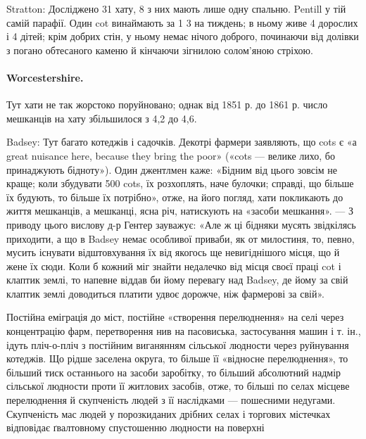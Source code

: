 Stratton: Досліджено 31 хату, 8 з них мають лише одну
спальню. Pentill у тій самій парафії. Один cot винаймають за
1 3 на тиждень; в ньому живе 4 дорослих і 4 дітей;
крім добрих стін, у ньому немає нічого доброго, починаючи від
долівки з погано обтесаного каменю й кінчаючи зігнилою солом’яною
стріхою.

\paragraph{Worcestershire.}

Тут хати не так жорстоко поруйновано; однак від 1851 р. до
1861 р. число мешканців на хату збільшилося з 4,2 до 4,6.

Badsey: Тут багато котеджів і садочків. Декотрі фармери
заявляють, що cots є «а great nuisance here, because they bring
the poor» («cots — велике лихо, бо принаджують бідноту»).
Один джентлмен каже: «Бідним від цього зовсім не краще; коли
збудувати 500 cots, їх розхоплять, наче булочки; справді, що
більше їх будують, то більше їх потрібно», отже, на його погляд,
хати покликають до життя мешканців, а мешканці, ясна річ,
натискують на «засоби мешкання». — З приводу цього вислову
д-р Гентер зауважує: «Але ж ці бідняки мусять звідкілясь
приходити, а що в Badsey немає особливої приваби, як от милостиня,
то, певно, мусить існувати відштовхування їх від якогось
ще невигіднішого місця, що й жене їх сюди. Коли б кожний міг
знайти недалечко від місця своєї праці cot і клаптик землі, то
напевне віддав би йому перевагу над Badsey, де йому за свій
клаптик землі доводиться платити удвоє дорожче, ніж фармерові
за свій».

Постійна еміграція до міст, постійне «створення перелюднення»
на селі через концентрацію фарм, перетворення нив на пасовиська,
застосування машин і т. ін., ідуть пліч-о-пліч з постійним
виганянням сільської людности через руйнування котеджів.
Що рідше заселена округа, то більше її «відносне перелюднення»,
то більший тиск останнього на засоби заробітку, то більший
абсолютний надмір сільської людности проти її житлових
засобів, отже, то більші по селах місцеве перелюднення й скупченість
людей з її наслідками — пошесними недугами. Скупченість
мас людей у порозкиданих дрібних селах і торгових містечках
відповідає ґвалтовному спустошенню людности на поверхні
\parbreak{}  %
